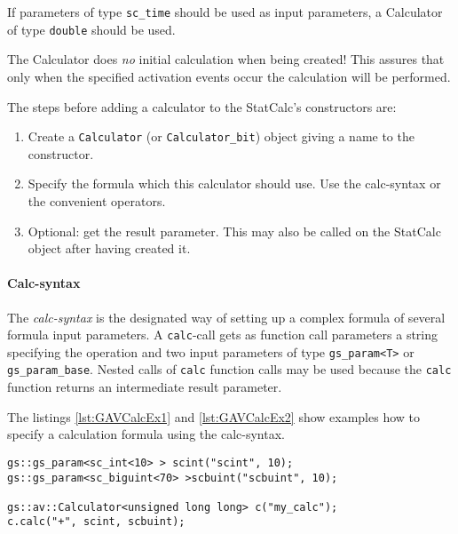 If parameters of type \lstinline|sc_time| should be used as input parameters, a Calculator of type \lstinline[language=TeX]|double| should be used.

The Calculator does {\em no} initial calculation when being created! This assures that only when the specified activation events occur the calculation will be performed.

The steps before adding a calculator to the StatCalc's constructors are:
\begin{enumerate}
  \item Create a \lstinline|Calculator| (or \lstinline|Calculator_bit|) object giving a name to the constructor.
  \item Specify the formula which this calculator should use. Use the calc-syntax or the convenient operators.
  \item Optional: get the result parameter. This may also be called on the StatCalc object after having created it.
\end{enumerate}

\paragraph{Calc-syntax}
The {\em calc-syntax} is the designated way of setting up a complex formula of several formula input parameters. A \lstinline|calc|-call gets as function call parameters a string specifying the operation and two input parameters of type \lstinline|gs_param<T>| or \lstinline|gs_param_base|. Nested calls of \lstinline|calc| function calls may be used because the \lstinline|calc| function returns an intermediate result parameter. 

The listings \ref{lst:GAVCalcEx1} and \ref{lst:GAVCalcEx2} show examples how to specify a calculation formula using the calc-syntax.

\noindent
\begin{minipage}{\textwidth}
\begin{lstlisting}[caption={
	Simple example using the calc-syntax: \newline 
	Calculator type: {\sffamily unsigned long long}, formula: $(scint + scbuint)$.
	}, label=lst:GAVCalcEx1]
gs::gs_param<sc_int<10> > scint("scint", 10); 
gs::gs_param<sc_biguint<70> >scbuint("scbuint", 10);

gs::av::Calculator<unsigned long long> c("my_calc");
c.calc("+", scint, scbuint);
\end{lstlisting}
\end{minipage}

